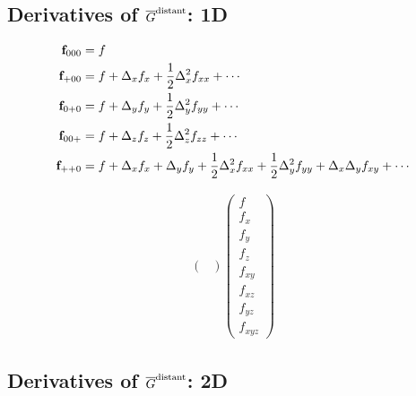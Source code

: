 \documentclass[letterpaper]{article}
\newcommand{\GB}{\overline{G}}
\begin{document}
\subsection{Derivatives of $\GB\sups{distant}$: 1D}

\begin{align*}
 \mathbf{f}_{000} &= f \\
 \mathbf{f}_{+00} &= f + \Delta_x f_x + \frac{1}{2}\Delta_x^2 f_{xx} + \cdots \\
 \mathbf{f}_{0+0} &= f + \Delta_y f_y + \frac{1}{2}\Delta_y^2 f_{yy} + \cdots \\
 \mathbf{f}_{00+} &= f + \Delta_z f_z + \frac{1}{2}\Delta_z^2 f_{zz} + \cdots \\
 \mathbf{f}_{++0} &= f + \Delta_x f_x + \Delta_y f_y 
                  + \frac{1}{2}\Delta_x^2 f_{xx} 
                  + \frac{1}{2}\Delta_y^2 f_{yy} 
                  + \Delta_x \Delta_y f_{xy} + \cdots 
\\
\end{align*}

\begin{align*}
 \left(\begin{array}{cccccccc}
 \end{array}\right)
 \left(\begin{array}{c}
 f \\ f_x \\ f_y \\ f_z \\ f_{xy} \\ f_{xz} \\ f_{yz} \\ f_{xyz}
 \end{array}\right)
\end{align*}

\subsection{Derivatives of $\GB\sups{distant}$: 2D}
\end{document}
